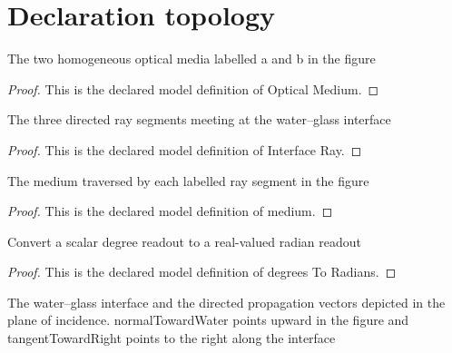 \section{Declaration topology}
\begin{definition}
  \label{def:physics:phyx-mini-0036:phyxminiproblems-problemphyxmini0036-opticalmedium}
  The two homogeneous optical media labelled a and b in the figure
\end{definition}
\begin{proof}
  This is the declared model definition of Optical Medium.
\end{proof}
\begin{definition}
  \label{def:physics:phyx-mini-0036:phyxminiproblems-problemphyxmini0036-interfaceray}
  The three directed ray segments meeting at the water--glass interface
\end{definition}
\begin{proof}
  This is the declared model definition of Interface Ray.
\end{proof}
\begin{definition}[medium]
  \label{def:physics:phyx-mini-0036:phyxminiproblems-problemphyxmini0036-interfaceray-medium}
  The medium traversed by each labelled ray segment in the figure
\end{definition}
\begin{proof}
  This is the declared model definition of medium.
\end{proof}
\begin{definition}
  \label{def:physics:phyx-mini-0036:phyxminiproblems-problemphyxmini0036-degreestoradians}
  Convert a scalar degree readout to a real-valued radian readout
\end{definition}
\begin{proof}
  This is the declared model definition of degrees To Radians.
\end{proof}
\begin{definition}
  \label{def:physics:phyx-mini-0036:phyxminiproblems-problemphyxmini0036-waterglassinterfacediagram}
  The water--glass interface and the directed propagation vectors depicted in the plane of incidence. normalTowardWater points upward in the figure and tangentTowardRight points to the right along the interface
\end{definition}
